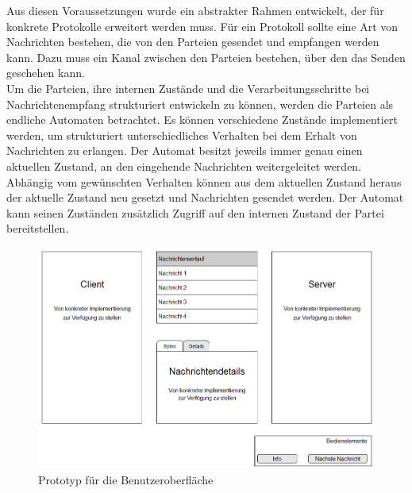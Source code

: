Aus diesen Voraussetzungen wurde ein abstrakter Rahmen entwickelt, der für konkrete Protokolle erweitert werden muss.
Für ein Protokoll sollte eine Art von Nachrichten bestehen, die von den Parteien gesendet und empfangen werden kann. Dazu muss ein Kanal zwischen den Parteien bestehen, über den das Senden geschehen kann.\\
Um die Parteien, ihre internen Zustände und die Verarbeitungsschritte bei Nachrichtenempfang strukturiert entwickeln zu können, werden die Parteien als endliche Automaten betrachtet. Es können verschiedene Zustände implementiert werden, um strukturiert unterschiedliches Verhalten bei dem Erhalt von Nachrichten zu erlangen. Der Automat besitzt jeweils immer genau einen aktuellen Zustand, an den eingehende Nachrichten weitergeleitet werden. Abhängig vom gewünschten Verhalten können aus dem aktuellen Zustand heraus der aktuelle Zustand neu gesetzt und Nachrichten gesendet werden. Der Automat kann seinen Zuständen zusätzlich Zugriff auf den internen Zustand der Partei bereitstellen.

\begin{figure}
	\centering
	\includegraphics[width=15cm]{Diagrams/SketchUI.png} %
	\caption{Prototyp für die Benutzeroberfläche}
	\label{fig_ui_sketch}
\end{figure}

